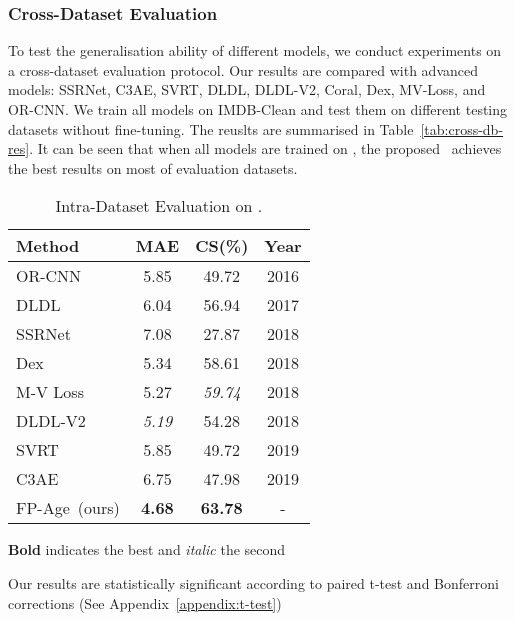 \subsubsection{Cross-Dataset Evaluation} To test the generalisation ability of different models, we conduct experiments on a cross-dataset evaluation protocol. Our results are compared with  advanced models: SSRNet, C3AE, SVRT, DLDL, DLDL-V2, Coral, Dex, MV-Loss, and OR-CNN. We train all models on IMDB-Clean and test them on  different testing datasets without fine-tuning. The reuslts are summarised in Table~\ref{tab:cross-db-res}. It can be seen that when all models are trained on \imdbc, the proposed \fpage~achieves the best results on most of evaluation datasets.
\begin{table}[tb] 
	\caption{Intra-Dataset Evaluation on \imdbc.}\label{tab:imdb-clean-results}
	\begin{center}
    	\begin{threeparttable}
    		\begin{tabular}{l|c|c|c}
    			\toprule
    			{Method} & {MAE}   & {CS(\%)}  & {Year}\\
    			\midrule
    			\midrule
    	    	OR-CNN~\cite{niuOrdinalRegressionMultiple2016} & 5.85
& 49.72 & 2016 \\		
    			DLDL~\cite{gaoDeepLabelDistribution2017}  & 6.04 & 56.94 & 2017 \\
    			SSRNet~\cite{ssrnet2018} &7.08 & 27.87 & 2018 \\
    			Dex~\cite{rotheDeepExpectationReal2018}  & 5.34 & 58.61 & 2018 \\
    			M-V Loss\cite{panMeanVarianceLossDeep2018} & 5.27 & \textit{59.74} & 2018 \\
    		    DLDL-V2~\cite{gaoAgeEstimationUsing2018}  & \textit{5.19} & 54.28 & 2018 \\
    			SVRT~\cite{imScaleVaryingTripletRanking2019} & 5.85 & 49.72 & 2019 \\
    			C3AE~\cite{zhangC3AEExploringLimits2019} &6.75 & 47.98 & 2019 \\
    			\midrule
    			FP-Age~(ours) & \textbf{4.68}\tnote{} & \textbf{63.78} &{-} \\
    			\bottomrule
    		\end{tabular}
    	
	
    	\begin{tablenotes}
    	\item \textbf{Bold} indicates the best and \textit{italic} the second
    	\item  Our results are statistically significant according to paired t-test and Bonferroni corrections (See Appendix~\ref{appendix:t-test})
    	\end{tablenotes}
    	\end{threeparttable}
	\end{center}
\end{table}


